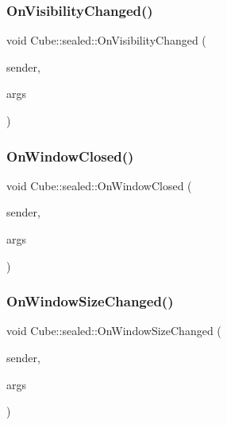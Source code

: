 \mbox{\label{class_cube_1_1sealed_aec9fe501363859f4c53a08f85c07db67}} 
\subsubsection{\texorpdfstring{On\+Visibility\+Changed()}{OnVisibilityChanged()}}
{\footnotesize\ttfamily void Cube\+::sealed\+::\+On\+Visibility\+Changed (\begin{DoxyParamCaption}\item[{Windows\+::\+U\+I\+::\+Core\+::\+Core\+Window$^\wedge$}]{sender,  }\item[{Windows\+::\+U\+I\+::\+Core\+::\+Visibility\+Changed\+Event\+Args$^\wedge$}]{args }\end{DoxyParamCaption})\hspace{0.3cm}{\ttfamily [protected]}}

\mbox{\label{class_cube_1_1sealed_ac8edc3442699dcdcd40b235a8d8ab906}} 
\subsubsection{\texorpdfstring{On\+Window\+Closed()}{OnWindowClosed()}}
{\footnotesize\ttfamily void Cube\+::sealed\+::\+On\+Window\+Closed (\begin{DoxyParamCaption}\item[{Windows\+::\+U\+I\+::\+Core\+::\+Core\+Window$^\wedge$}]{sender,  }\item[{Windows\+::\+U\+I\+::\+Core\+::\+Core\+Window\+Event\+Args$^\wedge$}]{args }\end{DoxyParamCaption})\hspace{0.3cm}{\ttfamily [protected]}}

\mbox{\label{class_cube_1_1sealed_accf4a33eb3419f7f81e564bf888846fc}} 
\subsubsection{\texorpdfstring{On\+Window\+Size\+Changed()}{OnWindowSizeChanged()}}
{\footnotesize\ttfamily void Cube\+::sealed\+::\+On\+Window\+Size\+Changed (\begin{DoxyParamCaption}\item[{Windows\+::\+U\+I\+::\+Core\+::\+Core\+Window$^\wedge$}]{sender,  }\item[{Windows\+::\+U\+I\+::\+Core\+::\+Window\+Size\+Changed\+Event\+Args$^\wedge$}]{args }\end{DoxyParamCaption})\hspace{0.3cm}{\ttfamily [protected]}}

